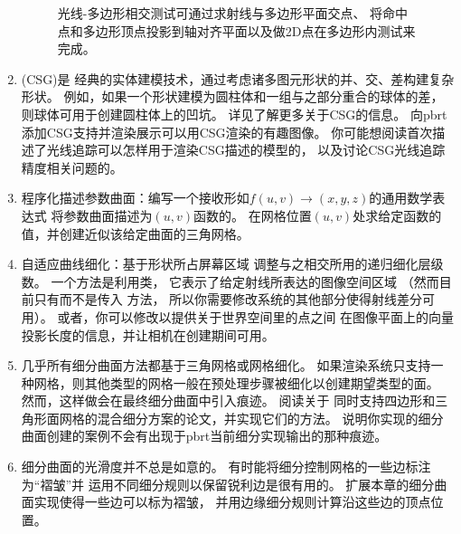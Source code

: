 \begin{enumerate}
\begin{figure}[htbp]
              \caption{光线-多边形相交测试可通过求射线与多边形平面交点、
                  将命中点和多边形顶点投影到轴对齐平面以及做2D点在多边形内测试来完成。}
              \label{fig:3.47}
          \end{figure}
    \item \circletwo {}(CSG)是
          经典的实体建模技术，通过考虑诸多图元形状的并、交、差构建复杂形状。
          例如，如果一个形状建模为圆柱体和一组与之部分重合的球体的差，
          则球体可用于创建圆柱体上的凹坑。
          详见\citet{10.5555/74803}了解更多关于CSG的信息。
          向pbrt添加CSG支持并渲染展示可以用CSG渲染的有趣图像。
          你可能想阅读首次描述了光线追踪可以怎样用于渲染CSG描述的模型的\citet{ROTH1982109}，
          以及讨论CSG光线追踪精度相关问题的\citet{10.5555/93267.93276}。
    \item \circletwo 程序化描述参数曲面：编写一个接收形如$f(u,v)\rightarrow(x,y,z)$的通用数学表达式
          将参数曲面描述为$(u,v)$函数的。
          在网格位置$(u,v)$处求给定函数的值，并创建近似该给定曲面的三角网格。
    \item \circletwo 自适应曲线细化：基于形状所占屏幕区域
          调整与之相交所用的递归细化层级数。
          一个方法是利用类，
          它表示了给定射线所表达的图像空间区域
          （然而目前只有而不是传入
          方法，
          所以你需要修改系统的其他部分使得射线差分可用）。
          或者，你可以修改以提供关于世界空间里的点之间
          在图像平面上的向量投影长度的信息，并让相机在创建期间可用。
    \item \circlethree 几乎所有细分曲面方法都基于三角网格或网格细化。
          如果渲染系统只支持一种网格，则其他类型的网格一般在预处理步骤被细化以创建期望类型的面。
          然而，这样做会在最终细分曲面中引入痕迹。
          阅读\citet{10.1111/1467-8659.t01-2-00647}关于
          同时支持四边形和三角形面网格的混合细分方案的论文，并实现它们的方法。
          说明你实现的细分曲面创建的案例不会有出现于pbrt当前细分实现输出的那种痕迹。
    \item \circletwo 细分曲面的光滑度并不总是如意的。
          有时能将细分控制网格的一些边标注为“褶皱”并
          运用不同细分规则以保留锐利边是很有用的。
          扩展本章的细分曲面实现使得一些边可以标为褶皱，
          并用边缘细分规则计算沿这些边的顶点位置。

\end{enumerate}
